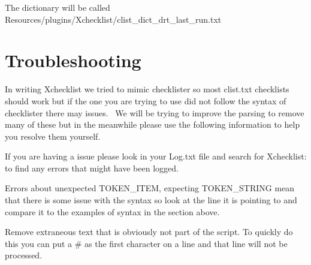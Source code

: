 \documentclass[11pt,parskip=half,a4paper]{scrartcl}
\begin{document}
The dictionary will be called Resources/plugins/Xchecklist/clist\_dict\_drt\_last\_run.txt

\section{Troubleshooting}

In writing Xchecklist we tried to mimic checklister so most clist.txt checklists should work but if the one you are trying to use did not follow the syntax of checklister there may issues. \ We will be trying to improve the parsing to remove many of these but in the meanwhile please use the following information to help you resolve them yourself. \ 

If you are having a issue please look in your Log.txt file and search for Xchecklist: to find any errors that might have been logged.

Errors about {\textquotedbl}unexpected TOKEN\_ITEM, expecting TOKEN\_STRING{\textquotedbl} mean that there is some issue with the syntax so look at the line it is pointing to and compare it to the examples of syntax in the section above.

Remove extraneous text that is obviously not part of the script. To quickly do this you can put a \# as the first character on a line and that line will not be processed.
\end{document}
